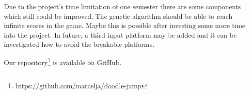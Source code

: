 \documentclass[a4paper,12pt,pagesize,headsepline,bibtotoc,titlepage,abstracton]{scrartcl}
\begin{document}
Due to the project's time limitation of one semester there are some components which still could be improved. The genetic algorithm should be able to reach infinite scores in the game. Maybe this is possible after investing some more time into the project. In future, a third input platform may be added and it can be investigated how to avoid the breakable platforms.

Our repository\footnote{\url{https://github.com/marcelja/doodle-jump}} is available on GitHub.

\newpage

 
\end{document}
